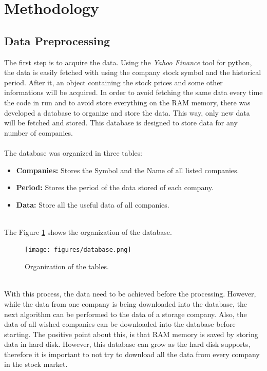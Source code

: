 \section{Methodology}
\label{sec:methodology}

\subsection{Data Preprocessing}
\label{subsec:preprocessing}
The first step is to acquire the data. Using the \textit{Yahoo Finance} tool for python, the data is easily fetched with using the company stock symbol and the historical period. After
it, an object containing the stock prices and some other informations will be acquired. In order to avoid fetching the same data every time the code in run and to avoid store everything 
on the RAM memory, there was developed a database to organize and store the data. This way, only new data will be fetched and stored. This database is designed to store data for any number
of companies.\\
\\
The database was organized in three tables:
\begin{itemize}
 \item \textbf{Companies:} Stores the Symbol and the Name of all listed companies.\\
 \item \textbf{Period:} Stores the period of the data stored of each company.\\
 \item \textbf{Data:} Store all the useful data of all companies.\\
\end{itemize}
\ \\
The Figure \ref{fig:db} shows the organization of the database.
\\
\begin{figure}[H]
\centering
\texttt{[image: figures/database.png]}
\caption{Organization of the tables.}
\label{fig:db}
\end{figure}
\ \\
With this process, the data need to be achieved before the processing. However, while the data from one company is being downloaded into the database, the next algorithm can be performed
to the data of a storage company. Also, the data of all wished companies can be downloaded into the database before starting. The positive point about this, is that RAM memory is saved
by storing data in hard disk. However, this database can grow as the hard disk supports, therefore it is important to not try to download all the data from every company in the stock market.
